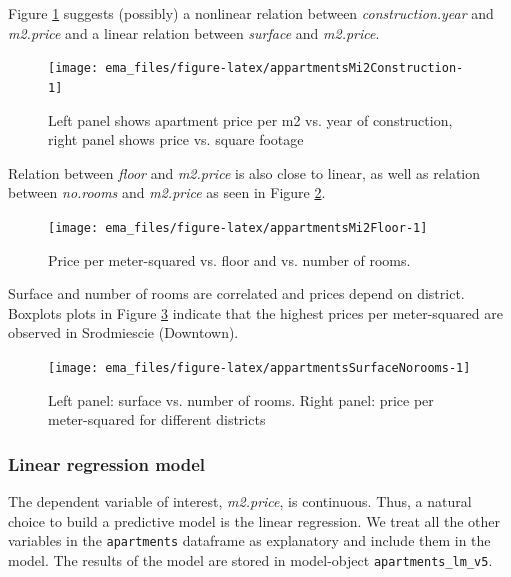 \documentclass[12pt,]{krantz}
\begin{document}
Figure \ref{fig:appartmentsMi2Construction} suggests (possibly) a nonlinear relation between \emph{construction.year} and \emph{m2.price} and a linear relation between \emph{surface} and \emph{m2.price}.

\begin{figure}

{\centering \texttt{[image: ema\_files/figure-latex/appartmentsMi2Construction-1]} 

}

\caption{Left panel shows apartment price per m2 vs. year of construction, right panel shows price  vs. square footage}\label{fig:appartmentsMi2Construction}
\end{figure}

Relation between \emph{floor} and \emph{m2.price} is also close to linear, as well as relation between \emph{no.rooms} and \emph{m2.price} as seen in Figure \ref{fig:appartmentsMi2Floor}.

\begin{figure}

{\centering \texttt{[image: ema\_files/figure-latex/appartmentsMi2Floor-1]} 

}

\caption{Price per meter-squared vs. floor and vs. number of rooms.}\label{fig:appartmentsMi2Floor}
\end{figure}

Surface and number of rooms are correlated and prices depend on district. Boxplots plots in Figure \ref{fig:appartmentsSurfaceNorooms} indicate that the highest prices per meter-squared are observed in Srodmiescie (Downtown).

\begin{figure}

{\centering \texttt{[image: ema\_files/figure-latex/appartmentsSurfaceNorooms-1]} 

}

\caption{Left panel: surface vs. number of rooms. Right panel: price per meter-squared for different districts}\label{fig:appartmentsSurfaceNorooms}
\end{figure}

\hypertarget{model-Apartments-lr}{%
\subsubsection{Linear regression model}\label{model-Apartments-lr}}

The dependent variable of interest, \emph{m2.price}, is continuous. Thus, a natural choice to build a predictive model is the linear regression. We treat all the other variables in the \texttt{apartments} dataframe as explanatory and include them in the model. The results of the model are stored in model-object \texttt{apartments\_lm\_v5}.
\end{document}

